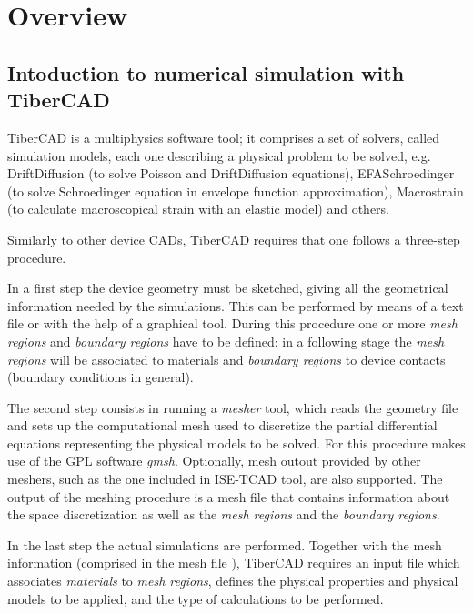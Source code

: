 \chapter{Overview}




\section{Intoduction to numerical simulation with TiberCAD{} }

TiberCAD{} is  a multiphysics software tool; it  comprises  a  set  of  solvers, called   simulation models, each one describing a physical problem to be solved, e.g. DriftDiffusion (to solve Poisson and DriftDiffusion equations), EFASchroedinger (to solve Schroedinger equation in envelope function  approximation), Macrostrain (to calculate macroscopical strain with an elastic model) and others.

Similarly to  other device CADs, TiberCAD{} requires that one follows
 a three-step procedure.

 In a first step the device geometry must be sketched, giving all the geometrical information needed by the simulations. This can be performed by means of a   text file or with the help of a graphical tool.
During  this  procedure one or more {\em mesh regions} and {\em boundary  regions} have  to  be  defined: in a following stage the  {\em mesh regions} will  be  associated to  materials and {\em boundary  regions} to device  contacts (boundary  conditions  in  general).

The second step consists in running a {\em mesher} tool, which reads the geometry file and sets up the computational mesh used to discretize the partial differential equations representing the physical models to be solved. For this procedure \tibercad  makes use of the GPL software {\em gmsh}. 
Optionally, mesh outout provided by other meshers, such as the one included in  ISE-TCAD tool, are also supported. 
The output of the meshing  procedure is a mesh file that contains information about the space discretization as well as the {\em mesh regions} and the {\em boundary  regions}. 

In the last step the actual simulations are performed. Together with the mesh information (comprised in the  mesh file ), TiberCAD{}  requires an input file which associates {\em materials} to {\em mesh regions}, defines the physical properties and physical models to be applied, and the type of calculations to be performed. 

